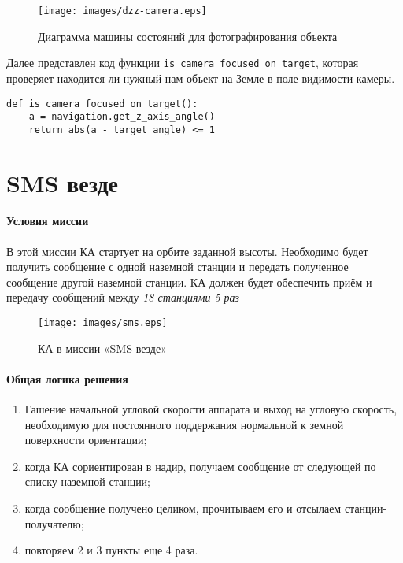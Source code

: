 \documentclass[12pt,a4paper]{article}
\begin{document}
\begin{figure}[tbh]
  \begin{flushright}
    \texttt{[image: images/dzz-camera.eps]}
    \caption{Диаграмма машины состояний для фотографирования объекта}
    \label{Pic:DZZ-camera}
  \end{flushright}
\end{figure}

Далее представлен код функции \verb'is_camera_focused_on_target', которая проверяет находится ли нужный нам объект на Земле в поле видимости камеры.

\begin{verbatim}
def is_camera_focused_on_target():
    a = navigation.get_z_axis_angle()
    return abs(a - target_angle) <= 1
\end{verbatim}

\section{SMS везде}

\paragraph{Условия миссии} В этой миссии КА стартует на орбите
заданной высоты. Необходимо будет получить сообщение с одной наземной станции и передать полученное сообщение другой наземной станции. КА должен будет обеспечить приём и передачу сообщений между \emph{18 станциями 5 раз}

\begin{figure}[tbh]
  \begin{center}
    \texttt{[image: images/sms.eps]}
    \caption{КА в миссии «SMS везде»}
    \label{Pic:SMS}
  \end{center}
\end{figure}


\paragraph{Общая логика решения} 

\begin{enumerate}
\item Гашение начальной угловой скорости аппарата и выход на угловую скорость, необходимую для постоянного поддержания нормальной к земной поверхности ориентации;
\item когда КА сориентирован в надир, получаем сообщение от следующей по списку наземной станции;
\item когда сообщение получено целиком, прочитываем его и отсылаем станции-получателю;
\item повторяем 2 и 3 пункты еще 4 раза.
\end{enumerate}
\end{document}
